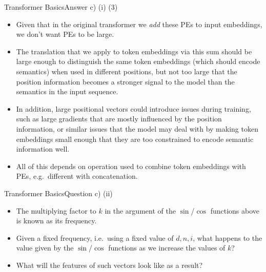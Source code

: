 \documentclass[t]{beamer}
\begin{document}
\begin{frame}{Transformer Basics}{Answer c) (i) (3)}
    \begin{itemize}
        \item Given that in the original transformer we \emph{add} these
              PEs to input embeddings, we don't want PEs to be large.
        \item The translation that we apply to token embeddings via this
              sum should be large enough to distinguish the same token
              embeddings (which should encode semantics) when used in
              different positions, but not too large that the position
              information becomes a stronger signal to the model than the
              semantics in the input sequence.
        \item In addition, large positional vectors could introduce issues
              during training, such as large gradients that are mostly
              influenced by the position information, or similar issues
              that the model may deal with by making token embeddings
              small enough that they are too constrained to encode
              semantic information well.
        \item All of this depends on operation used to combine token
              embeddings with PEs, e.g.\ different with concatenation.
    \end{itemize}
\end{frame}

\begin{frame}{Transformer Basics}{Question c) (ii)}
    \begin{itemize}
        \item The multiplying factor to $k$ in the argument of the $\sin$/$\cos$
              functions above is known as its frequency.
        \item Given a fixed frequency, i.e.\ using a fixed value of $d, n, i$,
              what happens to the value given by the $\sin$/$\cos$ functions as
              we increase the values of $k$?
        \item What will the features of such vectors look like as a result?
    \end{itemize}
\end{frame}
\end{document}
